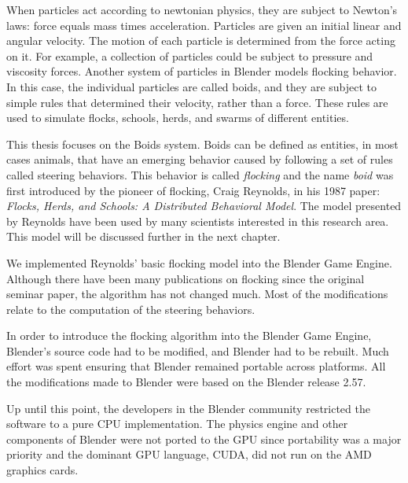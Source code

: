 

When particles act according to newtonian physics, they are subject to Newton's laws: force equals mass times acceleration. Particles are given an initial linear and angular velocity. The motion of each particle is determined from the force acting on it. For example, a collection of particles could be subject to pressure and viscosity forces. Another system of particles in Blender models flocking behavior. In this case, the individual particles are called boids, and they are subject to simple rules that determined their velocity, rather than a force. These rules are used to simulate flocks, schools, herds, and swarms of different entities.

This thesis focuses on the Boids system. Boids can be defined as entities, in most cases animals, that have an emerging behavior caused by following a set of rules called steering behaviors. This behavior is called \textit{flocking} and the name \textit{boid} was first introduced by the pioneer of flocking, Craig Reynolds, in his 1987 paper: \textit{Flocks, Herds, and Schools: A Distributed Behavioral Model}\cite{craig1}. The model presented by Reynolds have been used by many scientists interested in this research area. This model will be discussed further in the next chapter.

We implemented Reynolds' basic flocking model into the Blender Game Engine. Although there have been many publications on flocking since the original seminar paper, the algorithm has not changed much. Most of the modifications relate to the computation of the steering behaviors.

In order to introduce the flocking algorithm into the Blender Game Engine, Blender's source code had to be  modified, and Blender had to be rebuilt. Much effort was spent ensuring that Blender remained portable across platforms. All the modifications made to Blender were based on the Blender release 2.57. 



Up until this point, the developers in the Blender community restricted the software to a pure CPU implementation. The physics engine and other components of Blender were not ported to the GPU since portability was a major priority  and the dominant GPU language, CUDA, did not run on the AMD graphics cards.

